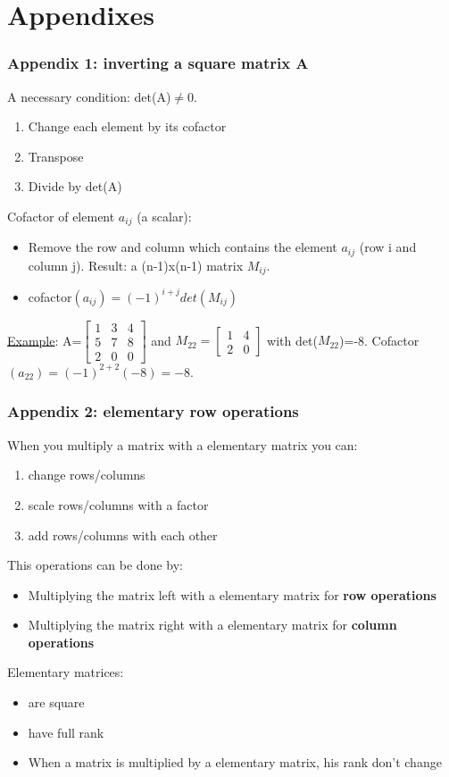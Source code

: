 \section{Appendixes}

\begin{frame}
	\frametitle{Appendix 1: inverting a square matrix A}
		A necessary condition: det(A)$\neq$0.
		\begin{enumerate}
			\item Change each element by its cofactor
			\item Transpose
			\item Divide by det(A) 
		\end{enumerate}
		Cofactor of element $a_{ij}$ (a scalar):
		\begin{itemize}
			\item Remove the row and column which contains the element $a_{ij}$ (row i and column j). Result: a (n-1)x(n-1) matrix $M_{ij}$.
			\item cofactor$(a_{ij})=(-1)^{i+j}det(M_{ij})$
		\end{itemize}
		\underline{Example}: A=$\begin{bmatrix} 1 & 3& 4\\
		5 & 7 & 8\\
		2 & 0 & 0 \end{bmatrix}$ and $M_{22}=\begin{bmatrix}
		1 & 4\\
		2 & 0
		\end{bmatrix}$ with det($M_{22}$)=-8. Cofactor$(a_{22})=(-1)^{2+2}(-8)=-8$.
\end{frame}

\begin{frame}
	\frametitle{Appendix 2: elementary row operations}
	When you multiply a matrix with a elementary matrix you can:
	\begin{enumerate}
		\item change rows/columns  
		\item scale rows/columns with a factor
		\item add rows/columns with each other
	\end{enumerate}
	This operations can be done by:
	\begin{itemize}
	\item Multiplying the matrix left with a elementary matrix for \textbf{row operations}
	\item Multiplying the matrix right with a elementary matrix for \textbf{column operations}
	\end{itemize}
	Elementary matrices:
	\begin{itemize}
	\item are square \\
	\item have full rank\\
	\item When a matrix is multiplied by a elementary matrix, his rank don't change
	\end{itemize}
\end{frame}

